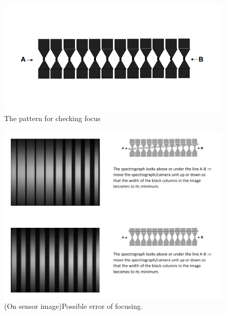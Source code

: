 \documentclass[12pt]{article}
\begin{document}
    \begin{figure}[t]
        \centering
        \includegraphics[width=0.8\linewidth]{focusPatern.png}
        \caption{The pattern for checking focus\cite{tn}}
        \label{figure: focus pattern}
    \end{figure}
    \begin{figure}[t]
        \centering
        \includegraphics[width=0.6\linewidth]{errorOfFocus.png}
        \caption{(On sensor image)Possible error of focusing. \cite{tn}}
        \label{figure: focus}
    \end{figure}
\end{document}
